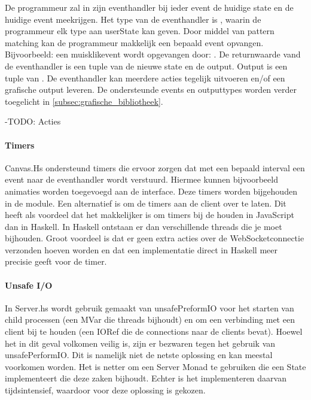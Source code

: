 De programmeur zal in zijn eventhandler bij ieder event de huidige state en de huidige event meekrijgen. Het type van de eventhandler is , waarin de programmeur elk type aan userState kan geven. Door middel van pattern matching kan de programmeur makkelijk een bepaald event opvangen. Bijvoorbeeld: een muisklikevent wordt opgevangen door: . De returnwaarde vand de eventhandler is een tuple van de nieuwe state en de output. Output is een tuple van . De eventhandler kan meerdere acties tegelijk uitvoeren en/of een grafische output leveren. De ondersteunde events en outputtypes worden verder toegelicht in \autoref{subsec:grafische_bibliotheek}.

-TODO: Acties   
\paragraph{Timers}
Canvas.Hs ondersteund timers die ervoor zorgen dat met een bepaald interval een event naar de eventhandler wordt verstuurd. Hiermee kunnen bijvoorbeeld animaties worden toegevoegd aan de interface. Deze timers worden bijgehouden in de module. Een alternatief is om de timers aan de client over te laten. Dit heeft als voordeel dat het makkelijker is om timers bij de houden in JavaScript dan in Haskell. In Haskell ontstaan er dan verschillende threads die je moet bijhouden. Groot voordeel is dat er geen extra acties over de WebSocketconnectie verzonden hoeven worden en dat een implementatie direct in Haskell meer precisie geeft voor de timer.

\paragraph{Unsafe I/O}
In Server.hs wordt gebruik gemaakt van unsafePreformIO voor het starten van child processen (een MVar die threads bijhoudt) en om een verbinding met een client bij te houden (een IORef die de connections naar de clients bevat). Hoewel het in dit geval volkomen veilig is, zijn er bezwaren tegen het gebruik van unsafePerformIO\cite{Haskell.org2008}. Dit is namelijk niet de netste oplossing en kan meestal voorkomen worden. Het is netter om een Server Monad te gebruiken die een State implementeert die deze zaken bijhoudt. Echter is het implementeren daarvan tijdsintensief, waardoor voor deze oplossing is gekozen.